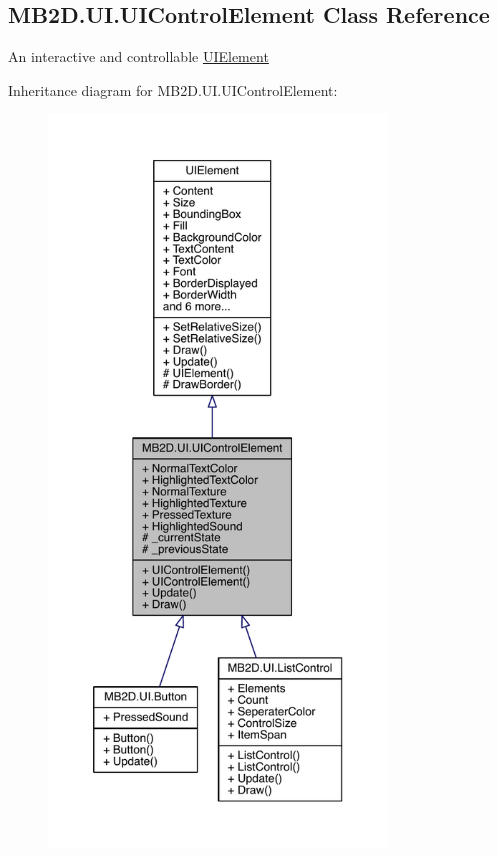 \hypertarget{class_m_b2_d_1_1_u_i_1_1_u_i_control_element}{}\subsection{M\+B2\+D.\+U\+I.\+U\+I\+Control\+Element Class Reference}
\label{class_m_b2_d_1_1_u_i_1_1_u_i_control_element}


An interactive and controllable \hyperlink{class_m_b2_d_1_1_u_i_1_1_u_i_element}{U\+I\+Element}  




Inheritance diagram for M\+B2\+D.\+U\+I.\+U\+I\+Control\+Element\+:
\nopagebreak
\begin{figure}[H]
\begin{center}
\leavevmode
\includegraphics[height=550pt]{class_m_b2_d_1_1_u_i_1_1_u_i_control_element__inherit__graph}
\end{center}
\end{figure}


